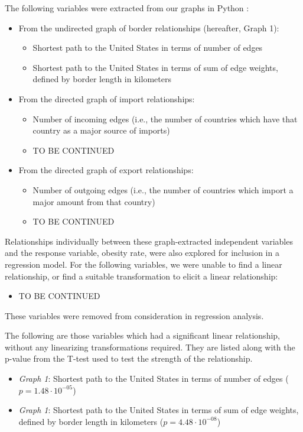 \documentclass[oneside,12pt]{report}
\begin{document}
The following variables were extracted from our graphs in Python :
\begin{itemize}
\item From the undirected graph of border relationships (hereafter, Graph 1):
	\begin{itemize}
	\item Shortest path to the United States in terms of number of edges
	\item Shortest path to the United States in terms of sum of edge weights, defined by border length in kilometers
	\end{itemize}
\item From the directed graph of import relationships:
	\begin{itemize}
	\item Number of incoming edges (i.e., the number of countries which have that country as a major source of imports)
	\item TO BE CONTINUED
	\end{itemize}
\item From the directed graph of export relationships:
	\begin{itemize}
	\item Number of outgoing edges (i.e., the number of countries which import a major amount from that country)
	\item TO BE CONTINUED
	\end{itemize}
\end{itemize}


Relationships individually between these graph-extracted independent variables and the response variable, obesity rate, were also explored for inclusion in a regression model. For the following variables, we were unable to find a linear relationship, or find a suitable transformation to elicit a linear relationship:

\begin{itemize}
\item TO BE CONTINUED
\end{itemize}

These variables were removed from consideration in regression analysis.

The following are those variables which had a significant linear relationship, without any linearizing transformations required. They are listed along with the p-value from the T-test used to test the strength of the relationship.

\begin{itemize}
\item \emph{Graph 1}: Shortest path to the United States in terms of number of edges (\begin{math}p=1.48\cdot10^{-05}\end{math})
\item \emph{Graph 1}: Shortest path to the United States in terms of sum of edge weights, defined by border length in kilometers (\begin{math}p=4.48\cdot10^{-08}\end{math})
\end{itemize}
\end{document}
